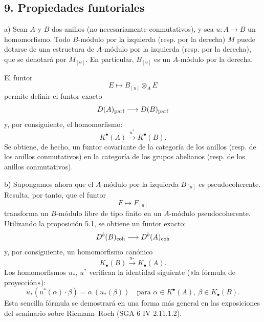 \subsection*{9. Propiedades funtoriales}

a) Sean $A$ y $B$ dos anillos (no necesariamente conmutativos), y sea $u:A\to B$ un homomorfismo. Todo $B$-módulo por la izquierda (resp. por la derecha) $M$ puede dotarse de una estructura de $A$-módulo por la izquierda (resp. por la derecha), que se denotará por $M_{[u]}$. En particular, $B_{[u]}$ es un $A$-módulo por la derecha.

El funtor
\[
E\longmapsto B_{[u]}\otimes_A E
\]
permite definir el funtor exacto
\[
D(A)_{\mathrm{parf}}\longrightarrow D(B)_{\mathrm{parf}}
\]
y, por consiguiente, el homomorfismo:
\[
K^{\bullet}(A)\xrightarrow{u^*}K^{\bullet}(B).
\]
Se obtiene, de hecho, un funtor covariante de la categoría de los anillos (resp. de los anillos conmutativos) en la categoría de los grupos abelianos (resp. de los anillos conmutativos).

b) Supongamos ahora que el $A$-módulo por la izquierda $B_{[u]}$ es pseudocoherente. Resulta, por tanto, que el funtor
\[
F\longmapsto F_{[u]}
\]
transforma un $B$-módulo libre de tipo finito en un $A$-módulo pseudocoherente. Utilizando la proposición 5.1, se obtiene un funtor exacto:
\[
D^b(B)_{\mathrm{coh}}\longrightarrow D^b(A)_{\mathrm{coh}}
\]
y, por consiguiente, un homomorfismo canónico
\[
K_\bullet(B)\xrightarrow{u_*}K_\bullet(A).
\]
Los homomorfismos $u_*$, $u^*$ verifican la identidad siguiente («la fórmula de proyección»):
\[
u_*(u^*(\alpha)\cdot \beta)=\alpha\,(u_*(\beta))
\quad\text{para }\alpha\in K^{\bullet}(A),\ \beta\in K_\bullet(B).
\]
Esta sencilla fórmula se demostrará en una forma más general en las exposiciones del seminario sobre Riemann--Roch (SGA 6 IV 2.11.1.2).
